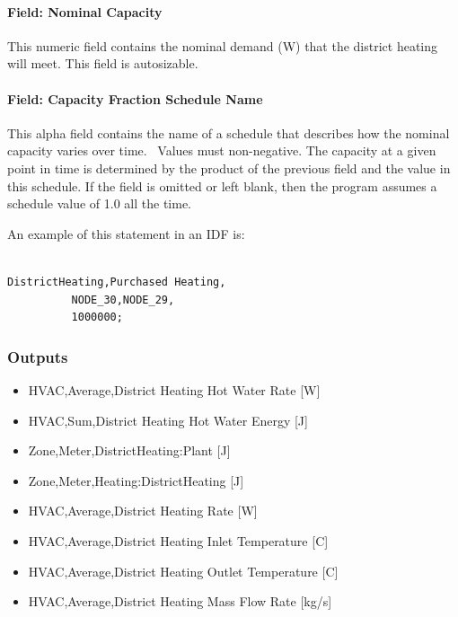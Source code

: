 \paragraph{Field: Nominal Capacity}\label{field-nominal-capacity-11}

This numeric field contains the nominal demand (W) that the district heating will meet. This field is autosizable.

\paragraph{Field: Capacity Fraction Schedule Name}\label{field-capacity-fraction-schedule-name-1}

This alpha field contains the name of a schedule that describes how the nominal capacity varies over time.~ Values must non-negative. The capacity at a given point in time is determined by the product of the previous field and the value in this schedule. If the field is omitted or left blank, then the program assumes a schedule value of 1.0 all the time.

An example of this statement in an IDF is:

\begin{lstlisting}

DistrictHeating,Purchased Heating,
          NODE_30,NODE_29,
          1000000;
\end{lstlisting}

\subsubsection{Outputs}\label{outputs-15-002}

\begin{itemize}
    \item
    HVAC,Average,District Heating Hot Water Rate {[}W{]}
    \item
    HVAC,Sum,District Heating Hot Water Energy {[}J{]}
    \item
    Zone,Meter,DistrictHeating:Plant {[}J{]}
    \item
    Zone,Meter,Heating:DistrictHeating {[}J{]}
    \item
    HVAC,Average,District Heating Rate {[}W{]}
    \item
    HVAC,Average,District Heating Inlet Temperature {[}C{]}
    \item
    HVAC,Average,District Heating Outlet Temperature {[}C{]}
    \item
    HVAC,Average,District Heating Mass Flow Rate {[}kg/s{]}
\end{itemize}

